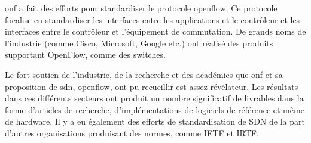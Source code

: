 \gls{onf} a fait des efforts pour standardiser le protocole \gls{openflow}. Ce protocole focalise en standardiser les interfaces entre les applications et le contrôleur et les interfaces entre le contrôleur et l'équipement de commutation. De grands noms de l'industrie (comme Cisco, Microsoft, Google etc.) ont réalisé des produits supportant OpenFlow, comme des switches. \cite{SurveySDNArchi} %




Le fort soutien de l'industrie, de la recherche et des académies que \gls{onf} et sa proposition de \gls{sdn}, \gls{openflow}, ont pu recueillir est assez révélateur. Les résultats dans ces différents secteurs ont produit un nombre significatif de livrables dans la forme d'articles de recherche, d'implémentations de logiciels de référence et même de hardware. Il y a eu également des efforts de standardisation de SDN de la part d'autres organisations produisant des normes, comme IETF et IRTF. \cite{SurveySDNIntro}


